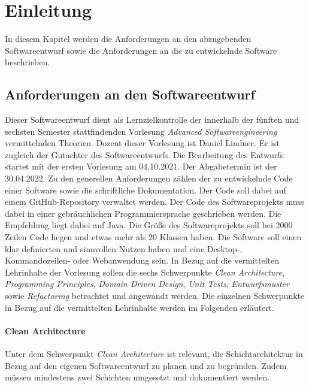 \chapter{Einleitung}
In diesem Kapitel werden die Anforderungen an den abzugebenden Softwareentwurf sowie die Anforderungen an die zu entwickelnde Software beschrieben.

\section{Anforderungen an den Softwareentwurf}
Dieser Softwareentwurf dient als Lernzielkontrolle der innerhalb der fünften und sechsten Semester stattfindenden Vorlesung \textit{Advanced Softwareengineering} vermittelnden Theorien.
Dozent dieser Vorlesung ist Daniel Lindner.
Er ist zugleich der Gutachter des Softwareentwurfs.
Die Bearbeitung des Entwurfs startet mit der ersten Vorlesung am 04.10.2021.
Der Abgabetermin ist der 30.04.2022.
Zu den generellen Anforderungen zählen der zu entwickelnde Code einer Software sowie die schriftliche Dokumentation.
Der Code soll dabei auf einem GitHub-Repository verwaltet werden.
Der Code des Softwareprojekts muss dabei in einer gebräuchlichen Programmiersprache geschrieben werden.
Die Empfehlung liegt dabei auf Java.
Die Größe des Softwareprojekts soll bei 2000 Zeilen Code liegen und etwas mehr als 20 Klassen haben.
Die Software soll einen klar definierten und sinnvollen Nutzen haben und eine Desktop-, Kommandozeilen- oder Webanwendung sein.
In Bezug auf die vermittelten Lehrinhalte der Vorlesung sollen die sechs Schwerpunkte \textit{Clean Architecture}, \textit{Programming Principles}, \textit{Domain Driven Design}, \textit{Unit Tests}, \textit{Entwurfsmuster} sowie \textit{Refactoring} betrachtet und angewandt werden.
Die einzelnen Schwerpunkte in Bezug auf die vermittelten Lehrinhalte werden im Folgenden erläutert.
\subsubsection*{Clean Architecture}
Unter dem Schwerpunkt \textit{Clean Architecture} ist relevant, die Schichtarchitektur in Bezug auf den eigenen Softwareentwurf zu planen und zu begründen.
Zudem müssen mindestens zwei Schichten umgesetzt und dokumentiert werden.

